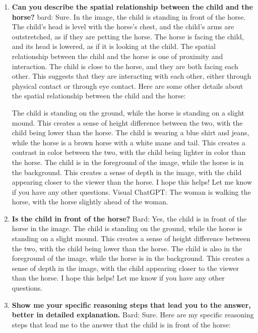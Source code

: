     \begin{enumerate}
        \item \textbf{Can you describe the spatial relationship between the child and the horse?}
        \subitem bard: 
        Sure. In the image, the child is standing in front of the horse. The child's head is level with the horse's chest, and the child's arms are outstretched, as if they are petting the horse. The horse is facing the child, and its head is lowered, as if it is looking at the child. The spatial relationship between the child and the horse is one of proximity and interaction. The child is close to the horse, and they are both facing each other. This suggests that they are interacting with each other, either through physical contact or through eye contact.
        Here are some other details about the spatial relationship between the child and the horse:

        The child is standing on the ground, while the horse is standing on a slight mound. This creates a sense of height difference between the two, with the child being lower than the horse.
        The child is wearing a blue shirt and jeans, while the horse is a brown horse with a white mane and tail. This creates a contrast in color between the two, with the child being lighter in color than the horse.
        The child is in the foreground of the image, while the horse is in the background. This creates a sense of depth in the image, with the child appearing closer to the viewer than the horse.
        I hope this helps! Let me know if you have any other questions.
        \subitem Visual ChatGPT: The woman is walking the horse, with the horse slightly ahead of the woman.
        \item \textbf{Is the child in front of the horse?}
        \subitem Bard: Yes, the child is in front of the horse in the image. The child is standing on the ground, while the horse is standing on a slight mound. This creates a sense of height difference between the two, with the child being lower than the horse. The child is also in the foreground of the image, while the horse is in the background. This creates a sense of depth in the image, with the child appearing closer to the viewer than the horse.
        I hope this helps! Let me know if you have any other questions.
        \item \textbf{Show me your specific reasoning steps that lead you to the answer, better in detailed explanation.}
        \subitem Bard: Sure. Here are my specific reasoning steps that lead me to the answer that the child is in front of the horse:


\end{enumerate}
